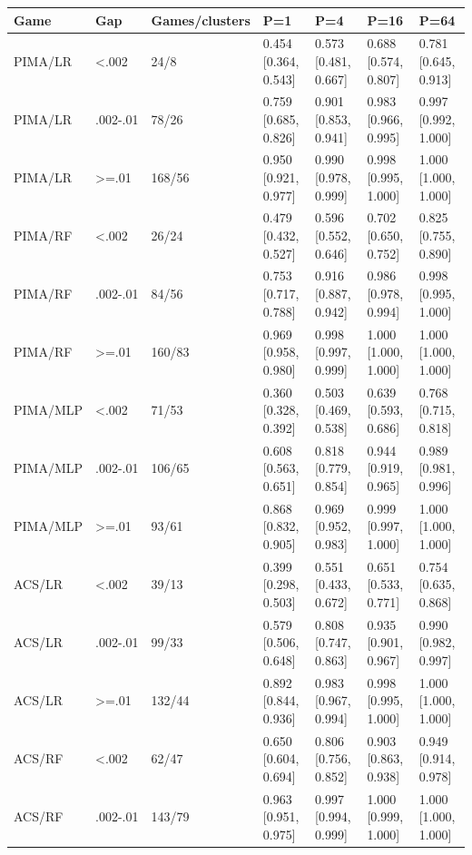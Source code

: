 \begingroup\footnotesize\setlength{\tabcolsep}{3pt}
\begin{tabular}{lllllll}
\toprule
Game & Gap & Games/clusters & P=1 & P=4 & P=16 & P=64 \\
\midrule
PIMA/LR & <.002 & 24/8 & 0.454 [0.364, 0.543] & 0.573 [0.481, 0.667] & 0.688 [0.574, 0.807] & 0.781 [0.645, 0.913] \\
PIMA/LR & .002-.01 & 78/26 & 0.759 [0.685, 0.826] & 0.901 [0.853, 0.941] & 0.983 [0.966, 0.995] & 0.997 [0.992, 1.000] \\
PIMA/LR & >=.01 & 168/56 & 0.950 [0.921, 0.977] & 0.990 [0.978, 0.999] & 0.998 [0.995, 1.000] & 1.000 [1.000, 1.000] \\
PIMA/RF & <.002 & 26/24 & 0.479 [0.432, 0.527] & 0.596 [0.552, 0.646] & 0.702 [0.650, 0.752] & 0.825 [0.755, 0.890] \\
PIMA/RF & .002-.01 & 84/56 & 0.753 [0.717, 0.788] & 0.916 [0.887, 0.942] & 0.986 [0.978, 0.994] & 0.998 [0.995, 1.000] \\
PIMA/RF & >=.01 & 160/83 & 0.969 [0.958, 0.980] & 0.998 [0.997, 0.999] & 1.000 [1.000, 1.000] & 1.000 [1.000, 1.000] \\
PIMA/MLP & <.002 & 71/53 & 0.360 [0.328, 0.392] & 0.503 [0.469, 0.538] & 0.639 [0.593, 0.686] & 0.768 [0.715, 0.818] \\
PIMA/MLP & .002-.01 & 106/65 & 0.608 [0.563, 0.651] & 0.818 [0.779, 0.854] & 0.944 [0.919, 0.965] & 0.989 [0.981, 0.996] \\
PIMA/MLP & >=.01 & 93/61 & 0.868 [0.832, 0.905] & 0.969 [0.952, 0.983] & 0.999 [0.997, 1.000] & 1.000 [1.000, 1.000] \\
ACS/LR & <.002 & 39/13 & 0.399 [0.298, 0.503] & 0.551 [0.433, 0.672] & 0.651 [0.533, 0.771] & 0.754 [0.635, 0.868] \\
ACS/LR & .002-.01 & 99/33 & 0.579 [0.506, 0.648] & 0.808 [0.747, 0.863] & 0.935 [0.901, 0.967] & 0.990 [0.982, 0.997] \\
ACS/LR & >=.01 & 132/44 & 0.892 [0.844, 0.936] & 0.983 [0.967, 0.994] & 0.998 [0.995, 1.000] & 1.000 [1.000, 1.000] \\
ACS/RF & <.002 & 62/47 & 0.650 [0.604, 0.694] & 0.806 [0.756, 0.852] & 0.903 [0.863, 0.938] & 0.949 [0.914, 0.978] \\
ACS/RF & .002-.01 & 143/79 & 0.963 [0.951, 0.975] & 0.997 [0.994, 0.999] & 1.000 [0.999, 1.000] & 1.000 [1.000, 1.000] \\

\end{tabular}
